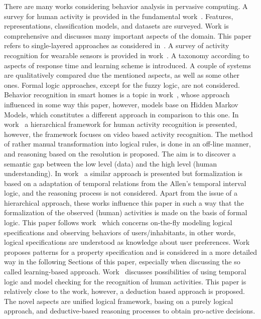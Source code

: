 \documentclass[runningheads,a4paper]{llncs}
\begin{document}
There are many works considering behavior analysis in pervasive computing.
A survey for human activity is provided in the fundamental work~\cite{Aggarwal-Ryoo-2011}.
Features, representations, classification models, and datasets are surveyed.
Work is comprehensive and discusses many important aspects of the domain.
This paper refers to single-layered approaches as considered in~\cite{Aggarwal-Ryoo-2011}.
A survey of activity recognition for wearable sensors is provided in work~\cite{Lara-Labrador-2013}.
A taxonomy according to aspects of response time and learning scheme is introduced.
A couple of systems are qualitatively compared due the mentioned aspects, as well as some other ones.
Formal logic approaches, except for the fuzzy logic, are not considered.
Behavior recognition in smart homes is a topic in work~\cite{Chua-etal-2009},
whose approach influenced in some way this paper,
however,
models base on Hidden Markov Models, which constitutes a different approach in comparison to this one.
In work~\cite{Chen-etal-2013} a hierarchical framework for human activity recognition is presented,
however, the framework focuses on video based activity recognition.
The method of rather manual transformation into logical rules,
is done in an off-line manner,
and reasoning based on the resolution is proposed.
The aim is to discover a semantic gap between
the low level (data) and the high level (human understanding).
In work~\cite{Chen-etal-2014} a similar approach is presented but
formalization is based on a adaptation of temporal relations from
the Allen's temporal interval logic,
and the reasoning process is not considered.
Apart from the issue of a hierarchical approach,
these works influence this paper in such a way that
the formalization of the observed (human) activities is made on the basis of formal logic.
This paper follows work~\cite{Klimek-Kotulski-2014-IE-AITAmI} which concerns
on-the-fly modeling logical specifications and observing behaviors of users/inhabitants,
in other words, logical specifications are understood as knowledge about user preferences.
Work~\cite{Dwyer-etal-1999} proposes patterns for a property specification and
is considered in a more detailed way in the following Sections of this paper,
especially when discussing the so called learning-based approach.
Work~\cite{Magherini-etal-2013} discusses possibilities of using temporal logic and
model checking for the recognition of human activities.
This paper is relatively close to the work,
however, a deduction based approach is proposed.
The novel aspects are  unified logical framework,
basing on a purely logical approach,
and deductive-based reasoning processes to obtain pro-active decisions.
\end{document}
